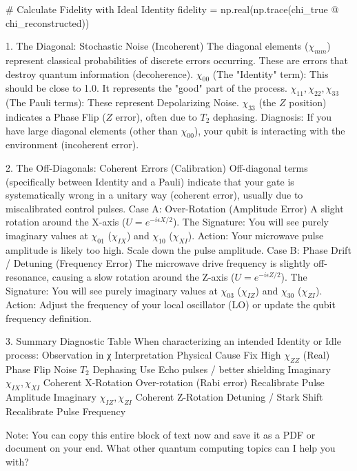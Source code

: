 # Calculate Fidelity with Ideal Identity
fidelity = np.real(np.trace(chi_true @ chi_reconstructed))


1. The Diagonal: Stochastic Noise (Incoherent)
The diagonal elements ($\chi_{mm}$) represent classical probabilities of discrete errors occurring. These are errors that destroy quantum information (decoherence).
$\chi_{00}$ (The "Identity" term): This should be close to 1.0. It represents the "good" part of the process.
$\chi_{11}, \chi_{22}, \chi_{33}$ (The Pauli terms): These represent Depolarizing Noise.
$\chi_{33}$ (the $Z$ position) indicates a Phase Flip ($Z$ error), often due to $T_2$ dephasing.
Diagnosis: If you have large diagonal elements (other than $\chi_{00}$), your qubit is interacting with the environment (incoherent error).

2. The Off-Diagonals: Coherent Errors (Calibration)
Off-diagonal terms (specifically between Identity and a Pauli) indicate that your gate is systematically wrong in a unitary way (coherent error), usually due to miscalibrated control pulses.
Case A: Over-Rotation (Amplitude Error)
A slight rotation around the X-axis ($U = e^{-i \epsilon X / 2}$).
The Signature:
You will see purely imaginary values at $\chi_{01}$ ($\chi_{IX}$) and $\chi_{10}$ ($\chi_{XI}$).
Action: Your microwave pulse amplitude is likely too high. Scale down the pulse amplitude.
Case B: Phase Drift / Detuning (Frequency Error)
The microwave drive frequency is slightly off-resonance, causing a slow rotation around the Z-axis ($U = e^{-i \epsilon Z / 2}$).
The Signature:
You will see purely imaginary values at $\chi_{03}$ ($\chi_{IZ}$) and $\chi_{30}$ ($\chi_{ZI}$).
Action: Adjust the frequency of your local oscillator (LO) or update the qubit frequency definition.

3. Summary Diagnostic Table
When characterizing an intended Identity or Idle process:
Observation in χ
Interpretation
Physical Cause
Fix
High $\chi_{ZZ}$ (Real)
Phase Flip Noise
$T_2$ Dephasing
Use Echo pulses / better shielding
Imaginary $\chi_{IX}, \chi_{XI}$
Coherent X-Rotation
Over-rotation (Rabi error)
Recalibrate Pulse Amplitude
Imaginary $\chi_{IZ}, \chi_{ZI}$
Coherent Z-Rotation
Detuning / Stark Shift
Recalibrate Pulse Frequency

Note: You can copy this entire block of text now and save it as a PDF or document on your end.
What other quantum computing topics can I help you with?

